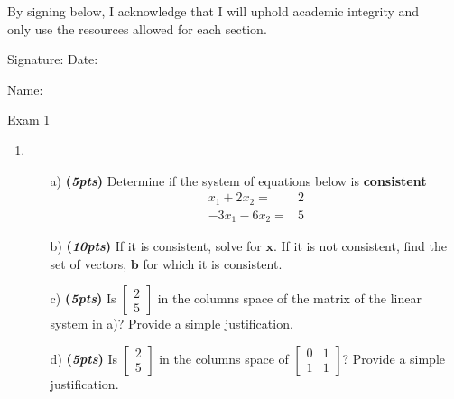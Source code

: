 \documentclass[12pt]{article}%
\begin{document}
By signing below, I \hrulefill \hrulefill \hspace{0.2cm} acknowledge that I will uphold academic integrity and\\ only use the resources allowed for each section.

\vspace{1cm}
Signature:\hrulefill \hspace{2cm} Date:\hrulefill

\vspace{0.5cm}

Name:\hrulefill

\newpage

Exam 1
\\
\HRule


\begin{enumerate}     
    \item 
    \begin{itemize}
        \item[a)] \textbf{(\emph{5pts})} Determine if the system of equations below is \textbf{consistent}
        \begin{eqnarray*}
            x_1 + 2x_2 =& 2\\
            -3x_1 - 6x_2 =& 5
        \end{eqnarray*}
        \vspace{3.5cm}
        \item[b)]\textbf{(\emph{10pts})} If it is consistent, solve for \(\mathbf{x}\).
        If it is not consistent, find the set of vectors, \(\mathbf{b}\) for which it is consistent.
        \vspace{6cm}
        \item[c)]\textbf{(\emph{5pts})} Is \(\begin{bmatrix} 2\\5 \end{bmatrix}\) in the columns space of the matrix of the linear system in a)?
        Provide  a simple justification.
        \vspace{4cm}
        \item[d)]\textbf{(\emph{5pts})} Is \(\begin{bmatrix} 2\\5 \end{bmatrix}\) in the columns space of \(\begin{bmatrix} 0 & 1 \\ 1 & 1 \end{bmatrix}\)?
        Provide a simple justification.
    \end{itemize}
    

\end{enumerate}
\end{document}
